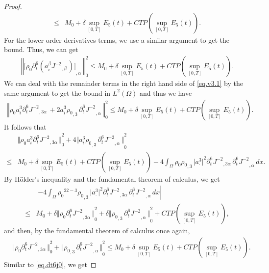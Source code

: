 \documentclass[12pt,twoside,reqno]{amsart}
\numberwithin{equation}{section}
\theoremstyle{definition}
\theoremstyle{remark}
\begin{document}
\begin{proof}
\begin{align*}
  {\leqslant}& M_0+\delta \sup_{[0,T]} E_5(t)+CTP(\sup_{[0,T]}E_5(t)).
\end{align*}
For the lower order derivatives terms, we use a similar argument to get the bound. Thus, we can get
\begin{align*}
  {\left\Vert{{{{\Big[{\rho_0}  {\partial}_t^6(a_i^\beta{{{J^{-2}}}_{,{\beta}}\,})\Big]}}_{,{\alpha}}\,}}\right\Vert}_0^2{\leqslant} M_0+\delta \sup_{[0,T]} E_5(t)+CTP(\sup_{[0,T]}E_5(t)).
\end{align*}
We can deal with the remainder terms in the right hand side of \eqref{eq.v3.1} by the same argument to get the bound in $L^2(\Omega)$ and thus we have
\begin{align*}
  {\left\Vert{{\rho_0}  a_i^3 {\partial}_t^6{{{J^{-2}}}_{,{3\alpha}}\,}+2 a_i^3{{\rho_0}_{,{3}}\,} {{{{\partial}_t^6 J^{-2}}}_{,{\alpha}}\,}}\right\Vert}_0^2{\leqslant} M_0+\delta \sup_{[0,T]} E_5(t)+CTP(\sup_{[0,T]}E_5(t)).
\end{align*}
It follows that
\begin{align*}
  &{\Vert{{\rho_0}  a_i^3 {\partial}_t^6{{{J^{-2}}}_{,{3\alpha}}\,}}\Vert}_0^2+4{\Vert{ a_i^3{{\rho_0}_{,{3}}\,} {{{{\partial}_t^6 J^{-2}}}_{,{\alpha}}\,}}\Vert}_0^2\\
  {\leqslant}& M_0+\delta \sup_{[0,T]} E_5(t)+CTP(\sup_{[0,T]}E_5(t))-4 \int_\Omega {\rho_0}{{\rho_0}_{,{3}}\,}{\vert{a_\cdot^3}\vert}^2{\partial}_t^6{{{J^{-2}}}_{,{3\alpha}}\,}{{{{\partial}_t^6 J^{-2}}}_{,{\alpha}}\,}dx.
\end{align*}
By H\"older's inequality and the fundamental theorem of calculus, we get
\begin{align*}
  &{\left\vert{-4\int_\Omega {\rho_0}^{22-3}{{\rho_0}_{,{3}}\,} {\vert{a_\cdot^3}\vert}^2 {\partial}_t^6{{{J^{-2}}}_{,{3\alpha}}\,}{{{{\partial}_t^6 J^{-2}}}_{,{\alpha}}\,} dx}\right\vert}\\
  {\leqslant} &M_0+\delta {\Vert{{\rho_0} {{{{\partial}_t^6 J^{-2}}}_{,{3\alpha}}\,}}\Vert}_0^2+\delta {\Vert{{{\rho_0}_{,{3}}\,}{{{{\partial}_t^6 J^{-2}}}_{,{\alpha}}\,}}\Vert}_0^2+CTP(\sup_{[0,T]}E_5(t)),
\end{align*}
and then, by the fundamental theorem of calculus once again,
\begin{align*}
  &{\Vert{{\rho_0}   {\partial}_t^6{{{J^{-2}}}_{,{3\alpha}}\,}}\Vert}_0^2+{\Vert{{{\rho_0}_{,{3}}\,} {{{{\partial}_t^6 J^{-2}}}_{,{\alpha}}\,}}\Vert}_0^2
  {\leqslant} M_0+\delta \sup_{[0,T]} E_5(t)+CTP(\sup_{[0,T]}E_5(t)).
\end{align*}
Similar to \eqref{eq.dt6j0}, we get

\end{proof}
\end{document}
